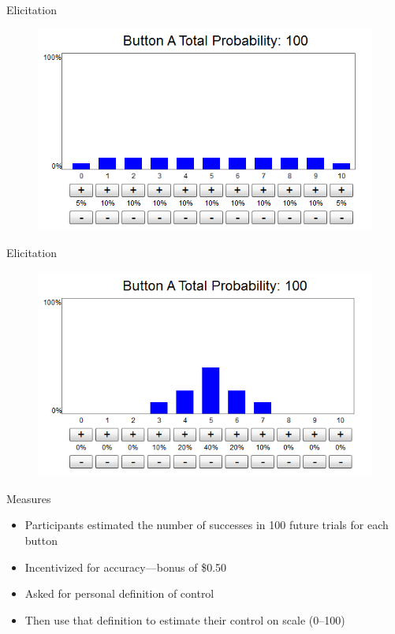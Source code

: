 \documentclass{beamer}
\begin{document}
\begin{frame}{Elicitation}
	\begin{figure}
	\begin{center}
		\includegraphics[width=\linewidth]{elicit_example_1}
	\end{center}
	\end{figure}
\end{frame}

\begin{frame}{Elicitation}
	\begin{figure}
	\begin{center}
		\includegraphics[width=\linewidth]{elicit_example_2}
	\end{center}
	\end{figure}
\end{frame}

\begin{frame}{Measures}
	\begin{itemize}
		\item Participants estimated the number of successes in 100 future trials for each button
		\item Incentivized for accuracy---bonus of \$0.50
		\item Asked for personal definition of control
		\item Then use that definition to estimate their control on scale (0--100)
	\end{itemize}
\end{frame}
\end{document}
